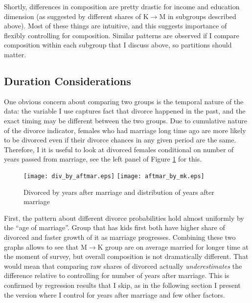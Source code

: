 \documentclass[12pt,letter]{article}
\begin{document}
Shortly, differences in composition are pretty drastic for income and education dimension (as suggested by different shares of K$\to$M in subgroups described above). Most of these things are intuitive, and this suggests importance of flexibly controlling for composition. Similar patterns are observed if I compare composition within each subgroup that I discuss above, so partitions should matter. 


\subsection{Duration Considerations}
One obvious concern about comparing two groups is the temporal nature of the data: the variable I use captures fact that divorce happened in the past, and the exact timing may be different between the two groups. Due to cumulative nature of the divorce indicator, females who had marriage long time ago are more likely to be divorced even if their divorce chances in any given period are the same. Therefore, I it is useful to look at divorced females conditional on number of years passed from marriage, see the left panel of Figure \ref{pic-aftmar} for this.
\begin{figure}[h!]
\texttt{[image: div\_by\_aftmar.eps]}
\texttt{[image: aftmar\_by\_mk.eps]}
\caption{Divorced by years after marriage and distribution of years after marriage\label{pic-aftmar}}
\end{figure}

First, the pattern about different divorce probabilities hold almost uniformly by the ``age of marriage''. Group that has kids first both have higher share of divorced and faster growth of it as marriage progresses. Combining these two graphs allows to see that M$\to$K group are on average married for longer time at the moment of survey, but overall composition is not dramatically different. That would mean that comparing raw shares of divorced actually \emph{underestimates} the difference relative to controlling for number of years after marriage. This is confirmed by regression results that I skip, as in the following section I present the version where I control for years after marriage and few other factors.
\end{document}

